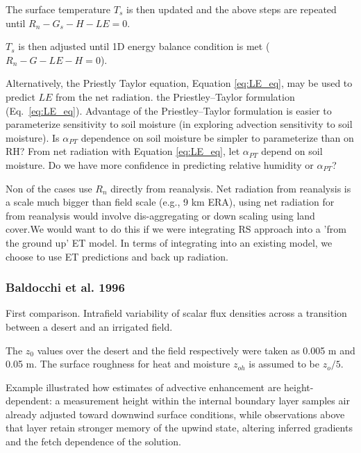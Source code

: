 \documentclass{article}
\begin{document}
    The surface temperature $T_s$ is then updated and the above steps are  repeated until $R_n - G_s - H - LE = 0$.
    
    $T_s$ is then adjusted until 1D energy balance condition is met ($R_n - G - LE - H = 0$). 
    
    Alternatively, the Priestly Taylor equation,  Equation \ref{eq:LE_eq}, may be used to predict $LE$ from the net radiation. 
    the Priestley--Taylor formulation (Eq.~\ref{eq:LE_eq}).
    Advantage of the  Priestley--Taylor formulation is easier to parameterize sensitivity to soil moisture (in exploring advection sensitivity to soil moisture). 
    Is $\alpha_{PT}$ dependence on soil moisture  be simpler to parameterize than on RH? 
    From net radiation with Equation \ref{eq:LE_eq}, let $\alpha_{PT}$ depend on soil moisture.  Do we have more confidence in predicting relative humidity or $\alpha_{PT}$? 
    
    
    Non of the cases use $R_n$ directly from reanalysis. 
    Net radiation from reanalysis is a scale much bigger than field scale (e.g., 9 km ERA), using net radiation for from reanalysis would involve dis-aggregating or down scaling using land cover.We would want to do this if we were integrating RS approach into a 'from the ground up' ET model. In terms of integrating into an existing model, we choose to use ET predictions and back up radiation.
    
    
    \subsubsection*{Baldocchi et al. 1996}

    
    First comparison. 
    Intrafield variability of scalar flux densities across a transition between a desert and an irrigated field. 
    
    The $z_0$ values over the desert and the field respectively were taken as 0.005 m and 0.05 m. 
    The surface roughness for heat and moisture $z_{oh}$ is assumed to be $z_o/5$.

    Example illustrated how estimates of advective enhancement are height-dependent: a measurement height within the internal boundary layer samples air already adjusted toward downwind surface conditions, while observations above that layer retain stronger memory of the upwind state, altering inferred gradients and the fetch dependence of the solution.
\end{document}
